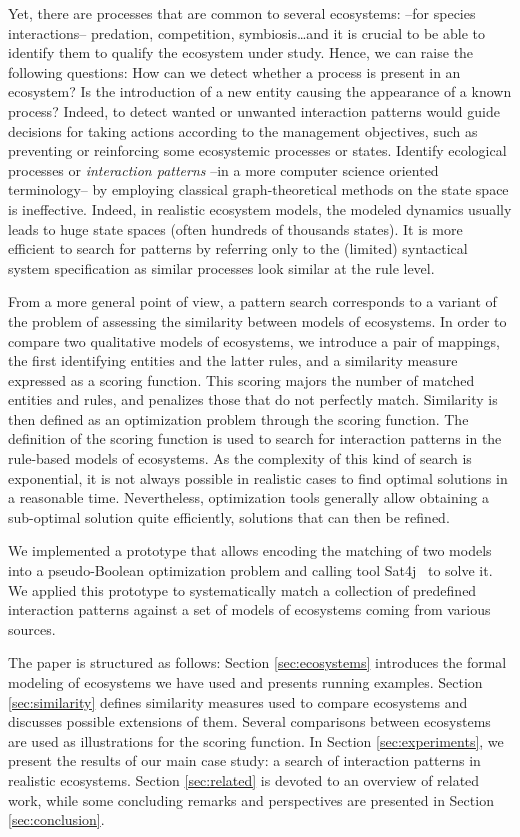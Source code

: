 \documentclass[a4paper,twoside]{article}
\begin{document}
Yet, there are processes that are common to several ecosystems: \eg --for species interactions-- predation, competition, symbiosis\ldots and it is crucial to be able to identify them to qualify the ecosystem under study. Hence, we can raise the following questions: How can we detect whether a process is present in an ecosystem? Is the introduction of a new entity causing the appearance of a known process? 
Indeed, to detect wanted or unwanted interaction patterns would guide decisions for taking actions according to the management objectives, such as preventing or reinforcing some ecosystemic processes or states. 
Identify ecological processes or  \emph{interaction patterns} --in a more computer science oriented terminology--  by employing classical graph-theoretical methods on the state space is ineffective. 
Indeed, in realistic ecosystem models, the modeled dynamics usually leads to huge state spaces (often hundreds of thousands states). 
It is more efficient to search for patterns by referring only to the (limited) syntactical system specification as similar processes look similar at the rule level.  

From a more general point of view, a pattern search corresponds to a variant of the  problem of assessing the similarity between models of ecosystems. 
%
In order to compare two qualitative models of ecosystems, we introduce a pair of mappings, the first identifying entities and the latter rules, and a similarity measure expressed as a scoring function.  
This scoring majors the number of matched entities and rules, and penalizes those that do not perfectly match. 
Similarity is then defined as an optimization problem through the scoring function. The definition of the scoring function is used to search for interaction patterns in the rule-based models of ecosystems. 
As the complexity of this kind of search is exponential, it is not always possible in realistic cases to find optimal solutions in a reasonable time. 
Nevertheless, optimization tools generally allow obtaining a sub-optimal solution quite efficiently, solutions that can then be refined. 

We implemented a prototype that allows encoding the matching of two models into a pseudo-Boolean optimization problem and calling tool Sat4j~\cite{sat4j} to solve it. 
We applied this prototype to systematically match a collection of predefined interaction patterns against a set of models of ecosystems coming from various sources. 
 
The paper is structured as follows: Section \ref{sec:ecosystems} introduces the formal modeling of ecosystems we have used and presents running examples. Section \ref{sec:similarity} defines similarity measures used to compare ecosystems and discusses possible extensions of them. 
Several comparisons between ecosystems are used as illustrations for the scoring function.
In Section \ref{sec:experiments}, we present the results of our main case study: a search of interaction patterns in realistic ecosystems. 
Section \ref{sec:related} is devoted to an overview of related work, while some concluding remarks and perspectives are presented in Section \ref{sec:conclusion}.  
\end{document}
